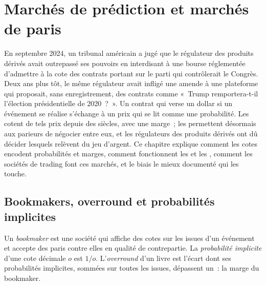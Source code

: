 \chapter{Marchés de prédiction et marchés de paris}\label{ch:m3:prediction-and-betting-markets}

En septembre 2024, un tribunal américain a jugé que le régulateur des produits dérivés avait outrepassé ses pouvoirs en
interdisant à une bourse réglementée d'admettre à la cote des contrats portant sur le parti qui contrôlerait le Congrès. Deux ans
plus tôt, le même régulateur avait infligé une amende à une plateforme  qui proposait, sans enregistrement, des contrats
comme «~Trump remportera-t-il l'élection présidentielle de 2020~?~». Un contrat qui verse un dollar si un événement se réalise s'échange à un prix qui se lit comme une probabilité.
Les  cotent de tels prix depuis des siècles, avec une marge~; les  permettent désormais aux parieurs de
négocier entre eux, et les régulateurs des produits dérivés ont dû décider lesquels relèvent du jeu d'argent.
Ce chapitre explique comment les cotes encodent probabilités et marges, comment fonctionnent les  et les
, comment les sociétés de trading font ces marchés, et le biais le mieux documenté qui les touche.

\section{Bookmakers, overround et probabilités implicites}

\begin{definition}\label{def:m3:prediction-and-betting-markets:book}
Un \emph{bookmaker} est une société qui affiche des cotes sur les issues d'un événement et accepte des paris contre elles en qualité de
contrepartie. La \emph{probabilité implicite} d'une cote décimale $o$ est $1/o$. L'\emph{overround}
d'un livre est l'écart dont ses probabilités implicites, sommées sur toutes les issues, dépassent un~: la marge du bookmaker.
\end{definition}

